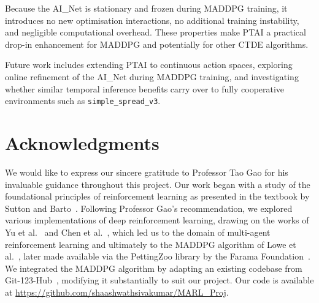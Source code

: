 \documentclass[12pt]{article}
\begin{document}
Because the AI\_Net is stationary and frozen during MADDPG training, it introduces no
new optimisation interactions, no additional training instability, and negligible
computational overhead. These properties make PTAI a practical drop-in enhancement for
MADDPG and potentially for other CTDE algorithms.

Future work includes extending PTAI to continuous action spaces, exploring online
refinement of the AI\_Net during MADDPG training, and investigating whether similar
temporal inference benefits carry over to fully cooperative environments such as
\texttt{simple\_spread\_v3}.

\section*{Acknowledgments}

We would like to express our sincere gratitude to Professor Tao Gao for his invaluable
guidance throughout this project. Our work began with a study of the foundational
principles of reinforcement learning as presented in the textbook by Sutton and
Barto~\cite{sutton2018reinforcement}. Following Professor Gao's recommendation, we
explored various implementations of deep reinforcement learning, drawing on the works
of Yu et al.~\cite{yu2021surprising} and Chen et al.~\cite{chen2016decentralized}, which
led us to the domain of multi-agent reinforcement learning and ultimately to the MADDPG
algorithm of Lowe et al.~\cite{lowe2017multi}, later made available via the PettingZoo
library by the Farama Foundation~\cite{terry2021pettingzoo}. We integrated the MADDPG
algorithm by adapting an existing codebase from Git-123-Hub~\cite{git123hub2021},
modifying it substantially to suit our project. Our code is available at
\url{https://github.com/shaashwathsivakumar/MARL_Proj}.
\end{document}
